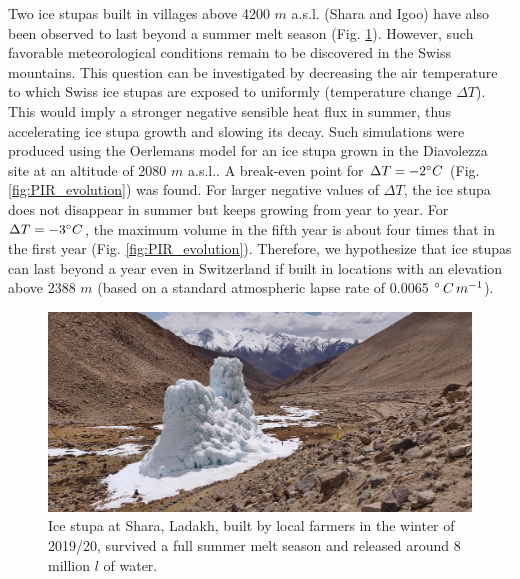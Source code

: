 Two ice stupas built in villages above 4200 $m$ \ac{a.s.l.} (Shara and Igoo) have also been observed to last
beyond a summer melt season (Fig. \ref{fig:PIR}). However, such favorable meteorological conditions remain to
be discovered in the Swiss mountains. This question can be investigated by decreasing the air temperature to which
Swiss ice stupas are exposed to uniformly (temperature change $\Delta T$). This would imply a stronger negative
sensible heat flux in summer, thus accelerating ice stupa growth and slowing its decay. Such simulations
were produced using the Oerlemans model for an ice stupa grown in the Diavolezza site at an altitude of 2080 $m$
\ac{a.s.l.}. A break-even point for $\Delta T = -2 ^{\circ} C$ (Fig. \ref{fig:PIR_evolution}) was found. For
larger negative values of $\Delta T$, the ice stupa does not disappear in summer but keeps growing from year to
year. For $\Delta T = -3 ^{\circ} C$, the maximum volume in the fifth year is about four times that in the first
year (Fig. \ref{fig:PIR_evolution}). Therefore, we hypothesize that ice stupas can last beyond a year even in
Switzerland if built in locations with an elevation above 2388 $m$ (based on a standard atmospheric lapse rate
of 0.0065 $^{\circ}\,C\,m^{-1}$).

\begin{figure}
	\centering
	\includegraphics[width=\textwidth]{figs/PIR_example.jpg}

	\caption{Ice stupa at Shara, Ladakh, built by local farmers in the winter of 2019/20, survived a full summer melt season and released
		around 8 million $l$ of water.}

	\label{fig:PIR}
\end{figure}

